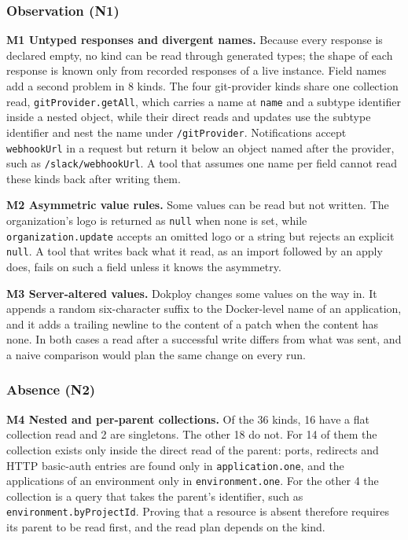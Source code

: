 \subsubsection*{Observation (N1)}

\textbf{M1 Untyped responses and divergent names.} Because every response is declared empty, no kind can be
read through generated types; the shape of each response is known only from recorded responses of a
live instance. Field names add a second problem in 8 kinds. The four git-provider kinds share one
collection read, \texttt{gitProvider.getAll}, which carries a name at \texttt{name} and a subtype identifier inside a
nested object, while their direct reads and updates use the subtype identifier and nest the name
under \texttt{/gitProvider}. Notifications accept \texttt{webhookUrl} in a request but return it below an object
named after the provider, such as \texttt{/slack/webhookUrl}. A tool that assumes one name per field cannot
read these kinds back after writing them.

\textbf{M2 Asymmetric value rules.} Some values can be read but not written. The organization's logo is
returned as \texttt{null} when none is set, while \texttt{organization.update} accepts an omitted logo or a string
but rejects an explicit \texttt{null}. A tool that writes back
what it read, as an import followed by an apply does, fails on such a field unless it knows the
asymmetry.

\textbf{M3 Server-altered values.} Dokploy changes some values on the way in. It appends a random
six-character suffix to the Docker-level name of an application, and it adds a trailing newline to the
content of a patch when the content has none. In both cases a read after a successful write differs
from what was sent, and a naive comparison would plan the same change on every run.

\subsubsection*{Absence (N2)}

\textbf{M4 Nested and per-parent collections.} Of the 36 kinds, 16 have a flat collection read and 2 are
singletons. The other 18 do not. For 14 of them the collection exists only inside the direct read of
the parent: ports, redirects and HTTP basic-auth entries are found only in \texttt{application.one}, and the
applications of an environment only in \texttt{environment.one}. For the other 4 the collection is a query
that takes the parent's identifier, such as \texttt{environment.byProjectId}. Proving that a resource is
absent therefore requires its parent to be read first, and the read plan depends on the kind.

